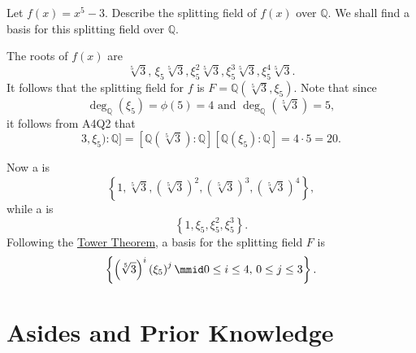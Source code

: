 \documentclass[notoc,notitlepage]{tufte-book}
\begin{document}
\begin{eg}
  Let $f(x) = x^5 - 3$. Describe the splitting field of $f(x)$ over $\mathbb{Q}$. We shall
  find a basis for this splitting field over $\mathbb{Q}$.

  The roots of $f(x)$ are
  \begin{equation*}
    \sqrt[5]{3}, \, \xi_5 \sqrt[5]{3}, \xi_5^2 \sqrt[5]{3}, \xi_5^3 \sqrt[5]{3}, \xi_5^4
    \sqrt[5]{3}.
  \end{equation*}
  It follows that the splitting field for $f$ is $F = \mathbb{Q}(\sqrt[5]{3}, \xi_5)$.
  Note that since
  \begin{equation*}
    \deg_{\mathbb{Q}}(\xi_5) = \phi(5) = 4 \text{ and } \deg_{\mathbb{Q}}(\sqrt[5]{3}) =
    5,
  \end{equation*}
  it follows from A4Q2 that
  \begin{equation*}
    [ \mathbb{Q}(\sqrt[5]{3}, \xi_5) : \mathbb{Q} ] = [ \mathbb{Q}(\sqrt[5]{3}) :
    \mathbb{Q} ][ \mathbb{Q}(\xi_5) : \mathbb{Q} ] = 4 \cdot 5 = 20.
  \end{equation*}

  Now a  is
  \begin{equation*}
    \left\{ 1, \sqrt[5]{3}, \left( \sqrt[5]{3} \right)^2, \left( \sqrt[5]{3} \right)^3,
    \left( \sqrt[5]{3} \right)^4 \right\},
  \end{equation*}
  while a  is
  \begin{equation*}
    \left\{ 1, \xi_5, \xi_5^2, \xi_5^3 \right\}.
  \end{equation*}
  Following the \hyperref[thm:tower_theorem]{Tower Theorem}, a basis for the splitting
  field $F$ is
  \begin{equation*}
    \left\{ \left( \sqrt[5]{3} \right)^i \left( \xi_5 \right)^j \mmid 0 \leq i \leq 4, \,
    0 \leq j \leq 3 \right\}.
  \end{equation*}
\end{eg}



\appendix

\chapter{Asides and Prior Knowledge}%
\label{chp:asides_and_prior_knowledge}
\end{document}
